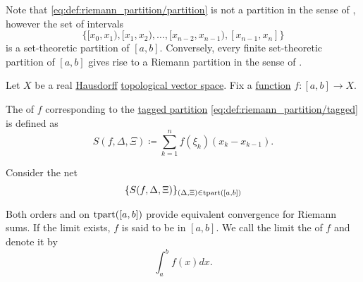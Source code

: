 \begin{remark}\label{rem:set_and_riemann_partitions}
  Note that \eqref{eq:def:riemann_partition/partition} is not a partition in the sense of , however the set of intervals
  \begin{equation*}
    \Big\{ [x_0, x_1), [x_1, x_2), \ldots, [x_{n-2}, x_{n-1}), [x_{n-1}, x_n] \Big\}
  \end{equation*}
  is a set-theoretic partition of \( [a, b] \). Conversely, every finite set-theoretic partition of \( [a, b] \) gives rise to a Riemann partition in the sense of .
\end{remark}

\begin{definition}\label{def:riemann_integral}
  Let \( X \) be a real \hyperref[def:separation_axioms/T2]{Hausdorff} \hyperref[def:topological_vector_space]{topological vector space}. Fix a \hyperref[def:function]{function} \( f: [a, b] \to X \).

  The  of \( f \) corresponding to the \hyperref[def:riemann_partition/tagged]{tagged partition} \eqref{eq:def:riemann_partition/tagged} is defined as
  \begin{equation*}
    S(f, \Delta, \Xi) \coloneqq \sum_{k=1}^n f(\xi_k) (x_k - x_{k-1}).
  \end{equation*}

  Consider the net
  \begin{equation}\label{eq:def:riemann_integral/net}
    \{ S(f, \Delta, \Xi) \}_{(\Delta, \Xi) \in \operatorname{tpart}([a, b])}
  \end{equation}

  Both orders  and  on \( \operatorname{tpart}([a, b]) \) provide equivalent convergence for Riemann sums. If the limit exists, \( f \) is said to be  in \( [a, b] \). We call the limit the  of \( f \) and denote it by
  \begin{equation}\label{eq:def:riemann_integral}
    \int_a^b f(x) dx.
  \end{equation}
\end{definition}
